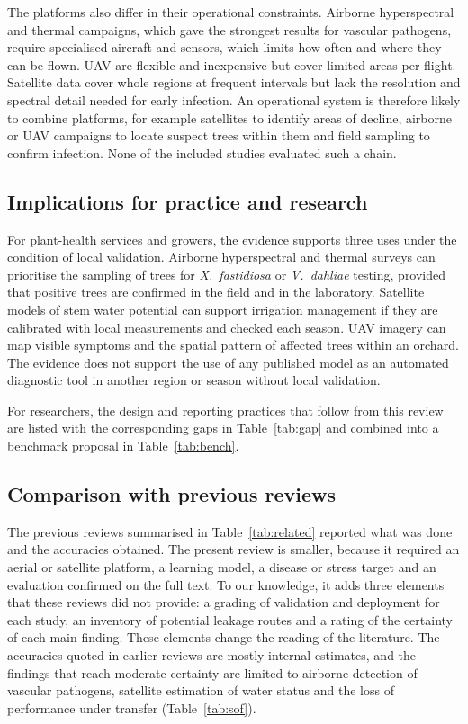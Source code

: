 \documentclass[preprint,12pt]{elsarticle}
\begin{document}
The platforms also differ in their operational constraints. Airborne hyperspectral and thermal campaigns, which gave the strongest results for vascular pathogens, require specialised aircraft and sensors, which limits how often and where they can be flown. UAV are flexible and inexpensive but cover limited areas per flight. Satellite data cover whole regions at frequent intervals but lack the resolution and spectral detail needed for early infection. An operational system is therefore likely to combine platforms, for example satellites to identify areas of decline, airborne or UAV campaigns to locate suspect trees within them and field sampling to confirm infection. None of the included studies evaluated such a chain.

\subsection{Implications for practice and research}\label{sec:disc_implications}
For plant-health services and growers, the evidence supports three uses under the condition of local validation. Airborne hyperspectral and thermal surveys can prioritise the sampling of trees for \textit{X.~fastidiosa} or \textit{V.~dahliae} testing, provided that positive trees are confirmed in the field and in the laboratory. Satellite models of stem water potential can support irrigation management if they are calibrated with local measurements and checked each season. UAV imagery can map visible symptoms and the spatial pattern of affected trees within an orchard. The evidence does not support the use of any published model as an automated diagnostic tool in another region or season without local validation.

For researchers, the design and reporting practices that follow from this review are listed with the corresponding gaps in Table~\ref{tab:gap} and combined into a benchmark proposal in Table~\ref{tab:bench}.

\subsection{Comparison with previous reviews}\label{sec:disc_reviews}
The previous reviews summarised in Table~\ref{tab:related} reported what was done and the accuracies obtained. The present review is smaller, because it required an aerial or satellite platform, a learning model, a disease or stress target and an evaluation confirmed on the full text. To our knowledge, it adds three elements that these reviews did not provide: a grading of validation and deployment for each study, an inventory of potential leakage routes and a rating of the certainty of each main finding. These elements change the reading of the literature. The accuracies quoted in earlier reviews are mostly internal estimates, and the findings that reach moderate certainty are limited to airborne detection of vascular pathogens, satellite estimation of water status and the loss of performance under transfer (Table~\ref{tab:sof}).
\end{document}
